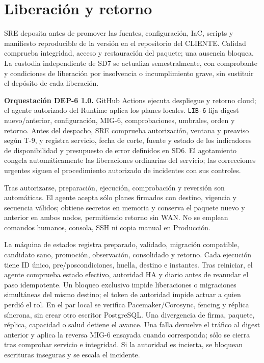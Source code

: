 \section{Liberación y retorno}
SRE deposita antes de promover las fuentes, configuración, IaC, scripts y manifiesto reproducible de la versión en el repositorio del CLIENTE. Calidad comprueba integridad, acceso y restauración del paquete; una ausencia bloquea. La custodia independiente de SD7 se actualiza semestralmente, con comprobante y condiciones de liberación por insolvencia o incumplimiento grave, sin sustituir el depósito de cada liberación. \parencite[art.~84.1/6, p.~43]{sd6-ba}

\textbf{Orquestación DEP-6 1.0.}
GitHub Actions ejecuta despliegue y retorno cloud; el agente autorizado del Runtime aplica los planes locales. \texttt{LIB-6} fija digest nuevo/anterior, configuración, MIG-6, comprobaciones, umbrales, orden y retorno. Antes del despacho, SRE comprueba autorización, ventana y preaviso según T-9, y registra servicio, fecha de corte, fuente y estado de los indicadores de disponibilidad y presupuesto de error definidos en SD6. El agotamiento congela automáticamente las liberaciones ordinarias del servicio; las correcciones urgentes siguen el procedimiento autorizado de incidentes con sus controles.

Tras autorizarse, preparación, ejecución, comprobación y reversión son automáticas. El agente acepta sólo planes firmados con destino, vigencia y secuencia válidos; obtiene secretos en memoria y conserva el paquete nuevo y anterior en ambos nodos, permitiendo retorno sin WAN. No se emplean comandos humanos, consola, SSH ni copia manual en Producción.

La máquina de estados registra preparado, validado, migración compatible, candidato sano, promoción, observación, consolidado y retorno. Cada ejecución tiene ID único, pre/poscondiciones, huella, destino e instantes. Tras reiniciar, el agente comprueba estado efectivo, autoridad HA y diario antes de reanudar el paso idempotente. Un bloqueo exclusivo impide liberaciones o migraciones simultáneas del mismo destino; el token de autoridad impide actuar a quien perdió el rol. En el par local se verifica Pacemaker/Corosync, fencing y réplica síncrona, sin crear otro escritor PostgreSQL. Una divergencia de firma, paquete, réplica, capacidad o salud detiene el avance. Una falla devuelve el tráfico al digest anterior y aplica la reversa MIG-6 ensayada cuando corresponda; sólo se cierra tras comprobar servicio e integridad. Si la autoridad es incierta, se bloquean escrituras inseguras y se escala el incidente. \parencite[RT-04.06, p.~11]{sd6-bt}

